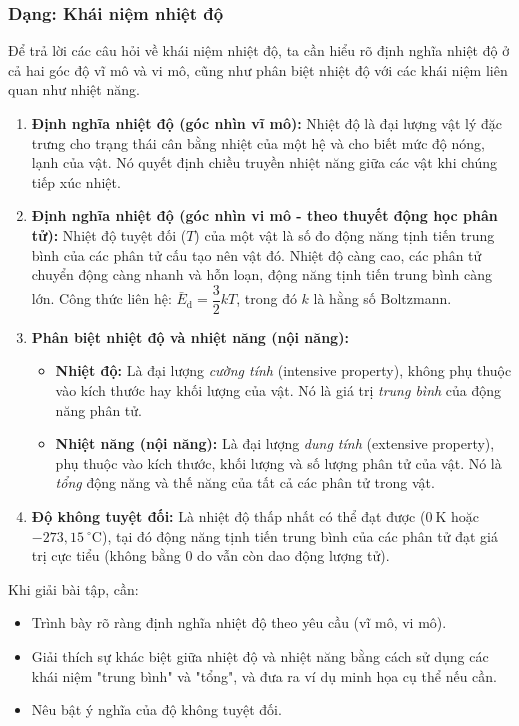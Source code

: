 \subsubsection{Dạng: Khái niệm nhiệt độ}
\begin{phuongphap}
	Để trả lời các câu hỏi về khái niệm nhiệt độ, ta cần hiểu rõ định nghĩa nhiệt độ ở cả hai góc độ vĩ mô và vi mô, cũng như phân biệt nhiệt độ với các khái niệm liên quan như nhiệt năng.
	\begin{enumerate}
		\item \textbf{Định nghĩa nhiệt độ (góc nhìn vĩ mô):}
		Nhiệt độ là đại lượng vật lý đặc trưng cho trạng thái cân bằng nhiệt của một hệ và cho biết mức độ nóng, lạnh của vật. Nó quyết định chiều truyền nhiệt năng giữa các vật khi chúng tiếp xúc nhiệt.
		\item \textbf{Định nghĩa nhiệt độ (góc nhìn vi mô - theo thuyết động học phân tử):}
		Nhiệt độ tuyệt đối ($T$) của một vật là số đo động năng tịnh tiến trung bình của các phân tử cấu tạo nên vật đó. Nhiệt độ càng cao, các phân tử chuyển động càng nhanh và hỗn loạn, động năng tịnh tiến trung bình càng lớn.
		Công thức liên hệ: $\bar{E}_{\mathrm{d}} = \dfrac{3}{2} k T$, trong đó $k$ là hằng số Boltzmann.
		\item \textbf{Phân biệt nhiệt độ và nhiệt năng (nội năng):}
		\begin{itemize}
			\item \textbf{Nhiệt độ:} Là đại lượng \textit{cường tính} (intensive property), không phụ thuộc vào kích thước hay khối lượng của vật. Nó là giá trị \textit{trung bình} của động năng phân tử.
			\item \textbf{Nhiệt năng (nội năng):} Là đại lượng \textit{dung tính} (extensive property), phụ thuộc vào kích thước, khối lượng và số lượng phân tử của vật. Nó là \textit{tổng} động năng và thế năng của tất cả các phân tử trong vật.
		\end{itemize}
		\item \textbf{Độ không tuyệt đối:}
		Là nhiệt độ thấp nhất có thể đạt được ($0\ \mathrm{K}$ hoặc $-273{,}15\ ^\circ\mathrm{C}$), tại đó động năng tịnh tiến trung bình của các phân tử đạt giá trị cực tiểu (không bằng 0 do vẫn còn dao động lượng tử).
	\end{enumerate}
	Khi giải bài tập, cần:
	\begin{itemize}
		\item Trình bày rõ ràng định nghĩa nhiệt độ theo yêu cầu (vĩ mô, vi mô).
		\item Giải thích sự khác biệt giữa nhiệt độ và nhiệt năng bằng cách sử dụng các khái niệm "trung bình" và "tổng", và đưa ra ví dụ minh họa cụ thể nếu cần.
		\item Nêu bật ý nghĩa của độ không tuyệt đối.
	\end{itemize}
\end{phuongphap}

